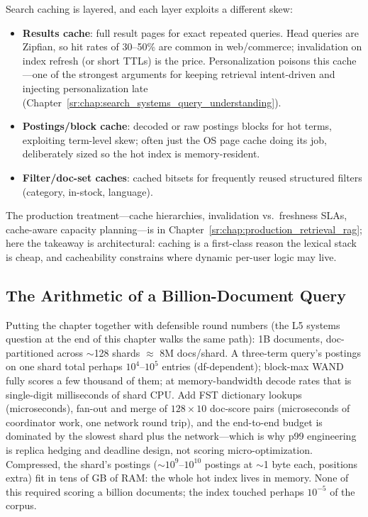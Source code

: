 Search caching is layered, and each layer exploits a different skew:

\begin{itemize}
    \item \textbf{Results cache}: full result pages for exact repeated queries. Head queries are Zipfian, so hit rates of 30--50\% are common in web/commerce; invalidation on index refresh (or short TTLs) is the price. Personalization poisons this cache---one of the strongest arguments for keeping retrieval intent-driven and injecting personalization late (Chapter~\ref{sr:chap:search_systems_query_understanding}).
    \item \textbf{Postings/block cache}: decoded or raw postings blocks for hot terms, exploiting term-level skew; often just the OS page cache doing its job, deliberately sized so the hot index is memory-resident.
    \item \textbf{Filter/doc-set caches}: cached bitsets for frequently reused structured filters (category, in-stock, language).
\end{itemize}

The production treatment---cache hierarchies, invalidation vs.\ freshness SLAs, cache-aware capacity planning---is in Chapter~\ref{sr:chap:production_retrieval_rag}; here the takeaway is architectural: caching is a first-class reason the lexical stack is cheap, and cacheability constrains where dynamic per-user logic may live.

\subsection{The Arithmetic of a Billion-Document Query}

Putting the chapter together with defensible round numbers (the L5 systems question at the end of this chapter walks the same path): 1B documents, doc-partitioned across $\sim$128 shards $\approx$ 8M docs/shard. A three-term query's postings on one shard total perhaps $10^4$--$10^5$ entries (df-dependent); block-max WAND fully scores a few thousand of them; at memory-bandwidth decode rates that is single-digit milliseconds of shard CPU. Add FST dictionary lookups (microseconds), fan-out and merge of $128 \times 10$ doc-score pairs (microseconds of coordinator work, one network round trip), and the end-to-end budget is dominated by the slowest shard plus the network---which is why p99 engineering is replica hedging and deadline design, not scoring micro-optimization. Compressed, the shard's postings ($\sim$$10^9$--$10^{10}$ postings at $\sim$1 byte each, positions extra) fit in tens of GB of RAM: the whole hot index lives in memory. None of this required scoring a billion documents; the index touched perhaps $10^{-5}$ of the corpus.

